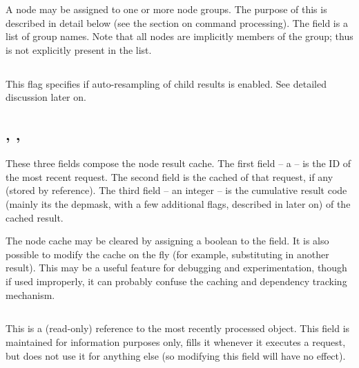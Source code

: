 \documentclass[10pt]{article}
\begin{document}
  A node may be assigned to one or more node groups. The purpose of this is
  described in detail below (see the section on command processing). The
   field is a list of  group names. Note that all
  nodes are implicitly members of the  group; thus  is not
  explicitly present in the list.

\subsection{}
  
  This flag specifies if auto-resampling of child results is enabled. See
  detailed discussion later on.

\subsection{, , }
  
  These three fields compose the node result cache. The first field -- a
   -- is the ID of the most recent request. The second field is the
  cached  of that request, if any (stored by reference). The third
  field -- an integer -- is the cumulative result code (mainly its the depmask,
  with a few additional flags, described in  later on) of the
  cached result.

  The node cache may be cleared by assigning a boolean  to the
   field. It is also possible to modify the cache on the fly
  (for example, substituting in another result). This may be a useful feature
  for debugging and experimentation, though if used improperly, it can probably
  confuse the caching and dependency tracking mechanism.  
  
\subsection{}

  This is a (read-only) reference to the most recently processed 
  object. This field is maintained for information purposes only, 
  fills it whenever it executes a request, but does not use it for anything
  else (so modifying this field will have no effect).

\subsection{}
\end{document}
